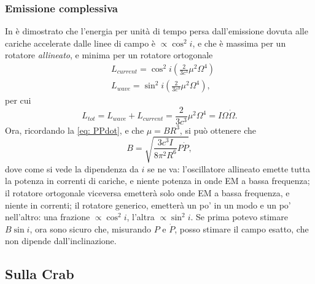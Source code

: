 \subsubsection{Emissione complessiva}
In \cite{Goldreich_Julian} è dimostrato che l'energia per unità di tempo persa dall'emissione dovuta alle cariche accelerate dalle linee di campo è $\propto \cos^2i$, e che è massima per un rotatore \textit{allineato}, e minima per un rotatore ortogonale
\begin{align}
    &L_{current}=\cos^2i\left( \frac{2}{3c^3}\mu^2\Omega^4 \right)\\
    &L_{wave}=\sin^2i\left( \frac{2}{3c^3}\mu^2\Omega^4 \right),
\end{align}
per cui
\begin{equation}
    L_{tot}=L_{wave}+L_{current}= \frac{2}{3c^3}\mu^2\Omega^4=I\Omega\dot{\Omega}.
\end{equation}
Ora, ricordando la \eqref{eq: PPdot}, e che $\mu = BR^3$, si può ottenere che 
\begin{equation}
    B=\sqrt{\frac{3c^3I}{8\pi^2R^6}P\dot{P}},
    \label{eq: B in funzione di PPdot}
\end{equation}
dove come si vede la dipendenza da $i$ se ne va:
l'oscillatore allineato emette tutta la potenza in correnti di cariche, e niente potenza in onde EM a bassa frequenza; il rotatore ortogonale viceversa emetterà solo onde EM a bassa frequenza, e niente in correnti; il rotatore generico, emetterà un po' in un modo e un po' nell'altro: una frazione $\propto\cos^2 {i} $, l'altra $\propto\sin^2 {i} $.
Se prima potevo stimare $B\sin{i}$, ora sono sicuro che, misurando $P$ e $\dot{P}$, posso stimare il campo esatto, che non dipende dall'inclinazione.

\subsection{Sulla Crab}
